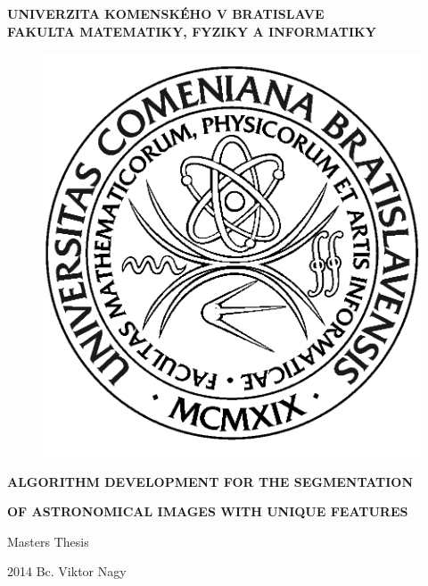 \documentclass[12pt, a4paper, oneside]{book}
\newcommand\mfthesistype{Masters Thesis}
\newcommand\mfauthor{Bc. Viktor Nagy}
\newcommand\mfuniversity{UNIVERZITA KOMENSKÉHO V BRATISLAVE}
\newcommand\mffaculty{FAKULTA MATEMATIKY, FYZIKY A INFORMATIKY}
\begin{document}
\frontmatter

\thispagestyle{empty}

\noindent
\begin{minipage}{\textwidth}
\begin{center}
\textbf{\mfuniversity \\
\mffaculty}
\end{center}
\end{minipage}

\vfill
\begin{figure}[!hbt]
	\begin{center}
		\includegraphics{images/logo_fmph}
		\label{img:logo}
	\end{center}
\end{figure}
\begin{center}
	\begin{minipage}{0.8\textwidth}
		\centerline{\textbf{\Large\MakeUppercase{Algorithm development for the segmentation}}}
		\centerline{\textbf{\Large\MakeUppercase{of astronomical images with unique features}}}
		\smallskip
		\centerline{\mfthesistype}
	\end{minipage}
\end{center}
\vfill
2014 \hfill
\mfauthor
\eject 
\end{document}
